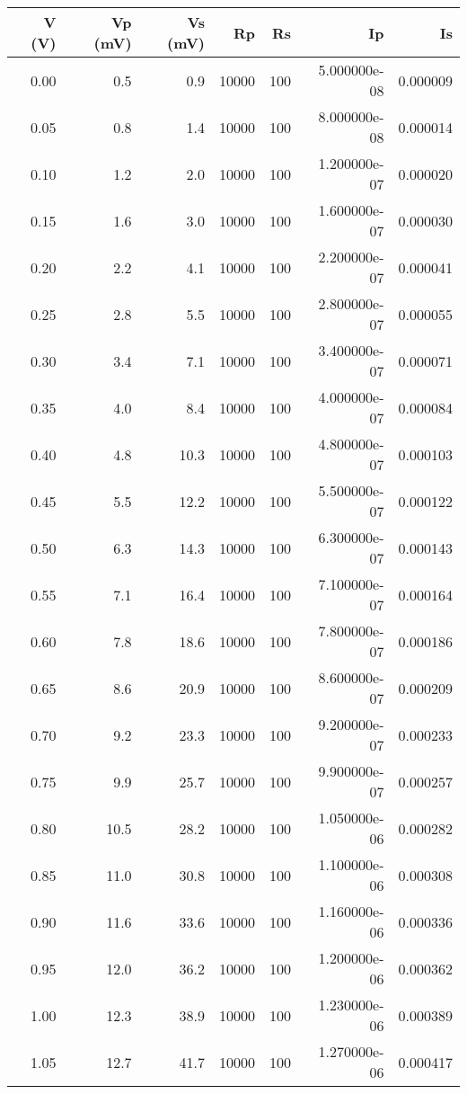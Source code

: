 \begin{tabular}{rrrrrrr}
\toprule
 V (V) &  Vp (mV) &  Vs (mV) &    Rp &  Rs &           Ip &       Is \\
\midrule
  0.00 &      0.5 &      0.9 & 10000 & 100 & 5.000000e-08 & 0.000009 \\
  0.05 &      0.8 &      1.4 & 10000 & 100 & 8.000000e-08 & 0.000014 \\
  0.10 &      1.2 &      2.0 & 10000 & 100 & 1.200000e-07 & 0.000020 \\
  0.15 &      1.6 &      3.0 & 10000 & 100 & 1.600000e-07 & 0.000030 \\
  0.20 &      2.2 &      4.1 & 10000 & 100 & 2.200000e-07 & 0.000041 \\
  0.25 &      2.8 &      5.5 & 10000 & 100 & 2.800000e-07 & 0.000055 \\
  0.30 &      3.4 &      7.1 & 10000 & 100 & 3.400000e-07 & 0.000071 \\
  0.35 &      4.0 &      8.4 & 10000 & 100 & 4.000000e-07 & 0.000084 \\
  0.40 &      4.8 &     10.3 & 10000 & 100 & 4.800000e-07 & 0.000103 \\
  0.45 &      5.5 &     12.2 & 10000 & 100 & 5.500000e-07 & 0.000122 \\
  0.50 &      6.3 &     14.3 & 10000 & 100 & 6.300000e-07 & 0.000143 \\
  0.55 &      7.1 &     16.4 & 10000 & 100 & 7.100000e-07 & 0.000164 \\
  0.60 &      7.8 &     18.6 & 10000 & 100 & 7.800000e-07 & 0.000186 \\
  0.65 &      8.6 &     20.9 & 10000 & 100 & 8.600000e-07 & 0.000209 \\
  0.70 &      9.2 &     23.3 & 10000 & 100 & 9.200000e-07 & 0.000233 \\
  0.75 &      9.9 &     25.7 & 10000 & 100 & 9.900000e-07 & 0.000257 \\
  0.80 &     10.5 &     28.2 & 10000 & 100 & 1.050000e-06 & 0.000282 \\
  0.85 &     11.0 &     30.8 & 10000 & 100 & 1.100000e-06 & 0.000308 \\
  0.90 &     11.6 &     33.6 & 10000 & 100 & 1.160000e-06 & 0.000336 \\
  0.95 &     12.0 &     36.2 & 10000 & 100 & 1.200000e-06 & 0.000362 \\
  1.00 &     12.3 &     38.9 & 10000 & 100 & 1.230000e-06 & 0.000389 \\
  1.05 &     12.7 &     41.7 & 10000 & 100 & 1.270000e-06 & 0.000417 \\

\end{tabular}
